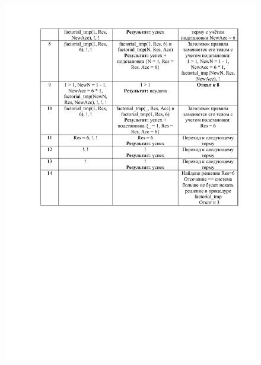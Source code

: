 \begin{figure}[H]
	\begin{center}
		\includegraphics[scale=0.85]{img/16.2.pdf}
	\end{center}
\end{figure}